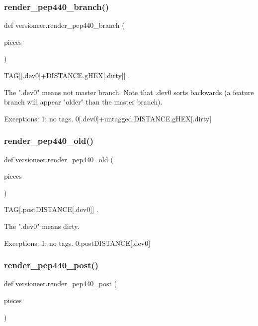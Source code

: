 \subsubsection{\texorpdfstring{render\+\_\+pep440\+\_\+branch()}{render\_pep440\_branch()}}
{\footnotesize\ttfamily def versioneer.\+render\+\_\+pep440\+\_\+branch (\begin{DoxyParamCaption}\item[{}]{pieces }\end{DoxyParamCaption})}

\begin{DoxyVerb}TAG[[.dev0]+DISTANCE.gHEX[.dirty]] .

The ".dev0" means not master branch. Note that .dev0 sorts backwards
(a feature branch will appear "older" than the master branch).

Exceptions:
1: no tags. 0[.dev0]+untagged.DISTANCE.gHEX[.dirty]
\end{DoxyVerb}
 \mbox{\label{namespaceversioneer_aeb727e76518be99a5cf86ddd8f7e4342}} 
\subsubsection{\texorpdfstring{render\+\_\+pep440\+\_\+old()}{render\_pep440\_old()}}
{\footnotesize\ttfamily def versioneer.\+render\+\_\+pep440\+\_\+old (\begin{DoxyParamCaption}\item[{}]{pieces }\end{DoxyParamCaption})}

\begin{DoxyVerb}TAG[.postDISTANCE[.dev0]] .

The ".dev0" means dirty.

Exceptions:
1: no tags. 0.postDISTANCE[.dev0]
\end{DoxyVerb}
 \mbox{\label{namespaceversioneer_ae5d8a1b4751ce8875001c1ca70d33da4}} 
\subsubsection{\texorpdfstring{render\+\_\+pep440\+\_\+post()}{render\_pep440\_post()}}
{\footnotesize\ttfamily def versioneer.\+render\+\_\+pep440\+\_\+post (\begin{DoxyParamCaption}\item[{}]{pieces }\end{DoxyParamCaption})}

